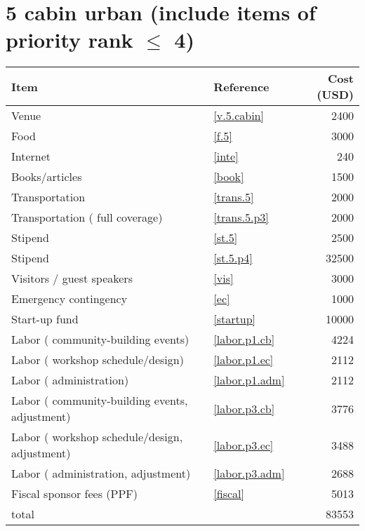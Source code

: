 \section*{5 cabin urban (include items of priority rank $\leq$ 4)}
\begin{center}
\begin{tabular}{llr}
Item & Reference & Cost (USD) \\ \hline
Venue & \ref{v.5.cabin} & 2400 \\
Food & \ref{f.5} & 3000 \\
Internet & \ref{inte} & 240 \\
Books/articles & \ref{book} & 1500 \\
Transportation & \ref{trans.5} & 2000 \\
Transportation ( full coverage) & \ref{trans.5.p3} & 2000 \\
Stipend & \ref{st.5} & 2500 \\
Stipend & \ref{st.5.p4} & 32500 \\
Visitors / guest speakers & \ref{vis} & 3000 \\
Emergency contingency & \ref{ec} & 1000 \\
Start-up fund & \ref{startup} & 10000 \\
Labor ( community-building events) & \ref{labor.p1.cb} & 4224 \\
Labor ( workshop schedule/design) & \ref{labor.p1.ec} & 2112 \\
Labor ( administration) & \ref{labor.p1.adm} & 2112 \\
Labor ( community-building events, adjustment) & \ref{labor.p3.cb} & 3776 \\
Labor ( workshop schedule/design, adjustment) & \ref{labor.p3.ec} & 3488 \\
Labor ( administration, adjustment) & \ref{labor.p3.adm} & 2688 \\
Fiscal sponsor fees (PPF) & \ref{fiscal} & 5013 \\ \hline
total &  & 83553
\end{tabular}
\end{center}
\newpage

